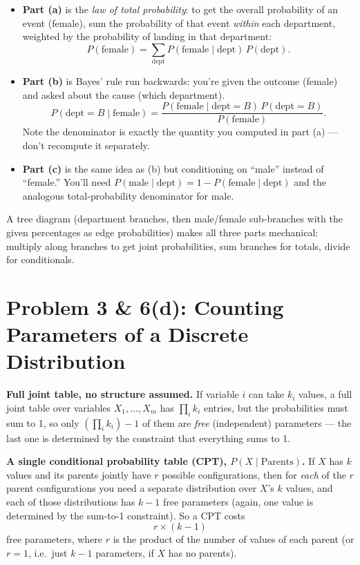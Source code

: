 \documentclass[11pt]{article}
\begin{document}
\begin{itemize}
  \item \textbf{Part (a)} is the \emph{law of total probability}: to get
        the overall probability of an event (female), sum the
        probability of that event \emph{within} each department,
        weighted by the probability of landing in that department:
        \[
          P(\text{female}) = \sum_{\text{dept}} P(\text{female}\mid \text{dept})\,P(\text{dept}).
        \]
  \item \textbf{Part (b)} is Bayes' rule run backwards: you're given the
        outcome (female) and asked about the cause (which department).
        \[
          P(\text{dept}=B \mid \text{female}) = \frac{P(\text{female}\mid \text{dept}=B)\,P(\text{dept}=B)}{P(\text{female})}.
        \]
        Note the denominator is exactly the quantity you computed in
        part (a) --- don't recompute it separately.
  \item \textbf{Part (c)} is the same idea as (b) but conditioning on
        ``male'' instead of ``female.'' You'll need
        $P(\text{male}\mid\text{dept}) = 1 - P(\text{female}\mid\text{dept})$
        and the analogous total-probability denominator for male.
\end{itemize}
A tree diagram (department branches, then male/female sub-branches with
the given percentages as edge probabilities) makes all three parts
mechanical: multiply along branches to get joint probabilities, sum
branches for totals, divide for conditionals.

\section*{Problem 3 \& 6(d): Counting Parameters of a Discrete Distribution}

\textbf{Full joint table, no structure assumed.} If variable $i$ can
take $k_i$ values, a full joint table over variables $X_1,\dots,X_m$ has
$\prod_i k_i$ entries, but the probabilities must sum to 1, so only
$\left(\prod_i k_i\right) - 1$ of them are \emph{free} (independent)
parameters --- the last one is determined by the constraint that
everything sums to 1.

\textbf{A single conditional probability table (CPT), $P(X \mid \text{Parents})$.}
If $X$ has $k$ values and its parents jointly have $r$ possible
configurations, then for \emph{each} of the $r$ parent configurations
you need a separate distribution over $X$'s $k$ values, and each of
those distributions has $k-1$ free parameters (again, one value is
determined by the sum-to-1 constraint). So a CPT costs
\[
  r \times (k - 1)
\]
free parameters, where $r$ is the product of the number of values of
each parent (or $r=1$, i.e.\ just $k-1$ parameters, if $X$ has no
parents).
\end{document}
